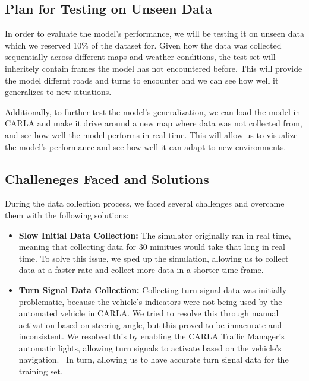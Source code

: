 \documentclass{article} %
\begin{document}
\subsection{Plan for Testing on Unseen Data}

In order to evaluate the model's performance, we will be testing it on unseen data which we reserved 10\% of the dataset for. Given how 
the data was collected sequentially across different maps and weather conditions, the test set will inheritely contain frames the model has not encountered before.
This will provide the model differnt roads and turns to encounter and we can see how well it generalizes to new situations.

Additionally, to further test the model's generalization, we can load the model in CARLA and make it drive around a new map where data was not collected from, and see how well the model performs in 
real-time. This will allow us to visualize the model's performance and see how well it can adapt to new environments.

\subsection{Challeneges Faced and Solutions}

During the data collection process, we faced several challenges and overcame them with the following solutions:

\begin{itemize}
  \item \textbf{Slow Initial Data Collection:} The simulator originally ran in real time, meaning that collecting data for 30 minitues would take that long in real time. 
  To solve this issue, we sped up the simulation, allowing us to collect data at a faster rate and collect more data in a shorter time frame.

  \item \textbf{Turn Signal Data Collection:} Collecting turn signal data was initially problematic, 
  because the vehicle's indicators were not being used by the automated vehicle in CARLA. 
  We tried to resolve this through manual activation based on steering angle, but this proved to be innacurate and inconsistent. 
  We resolved this by enabling the CARLA Traffic Manager’s automatic lights, allowing turn signals to activate based on the vehicle's navigation. \
  In turn, allowing us to have accurate turn signal data for the training set. 

\end{itemize}
 
\end{document}

